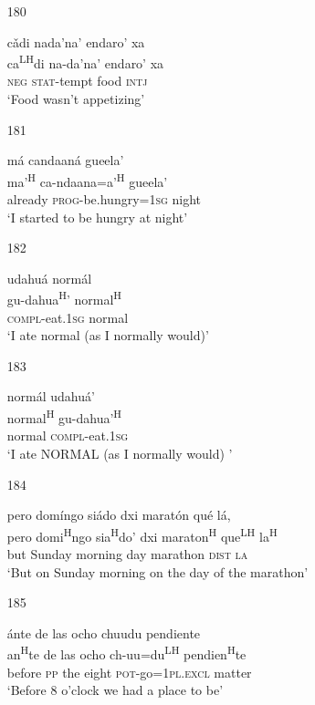 \begin{itemize}
\item[180]
 
\glll   c\v{a}di nada'na' endaro' xa \\
ca\textsuperscript{LH}di na-da'na' endaro' xa  \\
\textsc{neg} \textsc{stat}-tempt  food \textsc{intj} \\
\glt `Food wasn't appetizing'
 

\item[181]
 
\glll m\'{a} candaan\'{a} gueela' \\
ma'\textsuperscript{H} ca-ndaana=a'\textsuperscript{H} gueela' \\
already \textsc{prog}-be.hungry=\textsc{1sg} night \\
\glt `I started to be hungry at night'



\item[182] 

\glll udahu\'{a} norm\'{a}l \\
 gu-dahua\textsuperscript{H}' normal\textsuperscript{H} \\
\textsc{compl}-eat.\textsc{1sg} normal  \\
\glt `I ate normal (as I normally would)'


\item[183] 

\glll norm\'{a}l udahu\'{a}' \\
normal\textsuperscript{H} gu-dahua'\textsuperscript{H} \\
normal \textsc{compl}-eat.\textsc{1sg} \\
\glt `I ate NORMAL (as I normally would) '




\item[184]
 
\glll   pero dom\'{i}ngo si\'{a}do dxi marat\'{o}n qu\'{e} l\'{a},  \\
pero domi\textsuperscript{H}ngo sia\textsuperscript{H}do' dxi maraton\textsuperscript{H} que\textsuperscript{LH} la\textsuperscript{H} \\
but Sunday morning day marathon \textsc{dist} \textsc{la} \\
\glt `But on Sunday morning on the day of the marathon'
 


\item[185]
 
\glll  \'{a}nte de las ocho chuudu pendiente \\
an\textsuperscript{H}te de las ocho ch-uu=du\textsuperscript{LH} pendien\textsuperscript{H}te \\
before \textsc{pp} the eight \textsc{pot}-go=\textsc{1pl.excl} matter \\
\glt `Before 8 o'clock we had a place to be'
 



\end{itemize}
